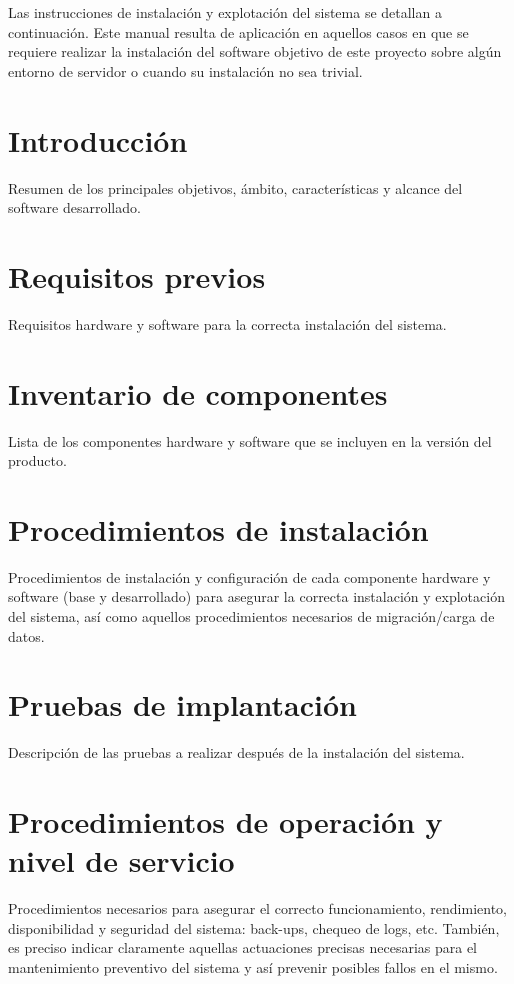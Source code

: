 

Las instrucciones de instalación y explotación del sistema se detallan a continuación. Este manual resulta de aplicación en aquellos casos en que se requiere realizar la instalación del software objetivo de este proyecto sobre algún entorno de servidor o cuando su instalación no sea trivial.

\section{Introducción}
Resumen de los principales objetivos, ámbito, características y alcance del software desarrollado.

\section{Requisitos previos}
Requisitos hardware y software para la correcta instalación del sistema.

\section{Inventario de componentes}
Lista de los componentes hardware y software que se incluyen en la versión del producto.

\section{Procedimientos de instalación}
Procedimientos de instalación y configuración de cada componente hardware y software (base y desarrollado) para asegurar la correcta instalación y explotación del sistema, así como aquellos procedimientos necesarios de migración/carga de datos.

\section{Pruebas de implantación}
Descripción de las pruebas a realizar después de la instalación del sistema. 

\section{Procedimientos de operación y nivel de servicio}
Procedimientos necesarios para asegurar el correcto funcionamiento, rendimiento, disponibilidad y seguridad del sistema: back-ups, chequeo de logs, etc. También, es preciso indicar claramente aquellas actuaciones precisas necesarias para el mantenimiento preventivo del sistema y así prevenir posibles fallos en el mismo. 

